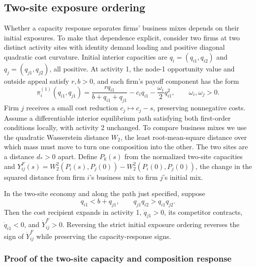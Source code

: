 \subsection{Two-site exposure ordering}\label{app:two-site-example}

Whether a capacity response separates firms' business mixes depends on
their initial exposures.
To make that dependence explicit, consider two firms at two distinct activity
sites with identity demand loading and positive diagonal quadratic cost
curvature.
Initial interior capacities are $q_i=(q_{i1},q_{i2})$ and
$q_j=(q_{j1},q_{j2})$, all positive.
At activity 1, the node-1 opportunity value and outside appeal satisfy $r,b>0$,
and each firm's payoff component has the form
\begin{equation}\label{eq:sign-payoff}
  \pi_i^{(1)}(q_{i1},q_{j1})
  =\frac{rq_{i1}}{b+q_{i1}+q_{j1}}-c_i q_{i1}-\frac{\omega_i}{2}q_{i1}^2,
  \qquad \omega_i,\omega_j>0.
\end{equation}
Firm $j$ receives a small cost reduction $c_j\mapsto c_j-s$, preserving
nonnegative costs.
Assume a differentiable interior equilibrium path satisfying both first-order
conditions locally, with activity 2 unchanged.
To compare business mixes we use the quadratic Wasserstein distance $W_2$,
the least root-mean-square distance over which mass must move to turn one
composition into the other.
The two sites are a distance $d_*>0$ apart.
Define $P_k(s)$ from the normalized two-site capacities and
$Y^F_{ij}(s)=W_2^2(P_i(s),P_j(0))-W_2^2(P_i(0),P_j(0))$, the change in the
squared distance from firm $i$'s business mix to firm $j$'s initial mix.

\begin{proposition}\label{prop:two-site-adjustment}
  In the two-site economy and along the path just specified, suppose
  \begin{equation}\label{eq:sign-conditions}
    q_{i1}<b+q_{j1},\qquad q_{j1}q_{i2}>q_{i1}q_{j2}.
  \end{equation}
  Then the cost recipient expands in activity 1, $\dot q_{j1}>0$, its competitor
  contracts, $\dot q_{i1}<0$, and $\dot Y^F_{ij}>0$.
  Reversing the strict initial exposure ordering reverses the sign of
  $\dot Y^F_{ij}$ while preserving the capacity-response signs.
\end{proposition}

\subsubsection{Proof of the two-site capacity and composition
response}\label{app:two-site-adjustment}

